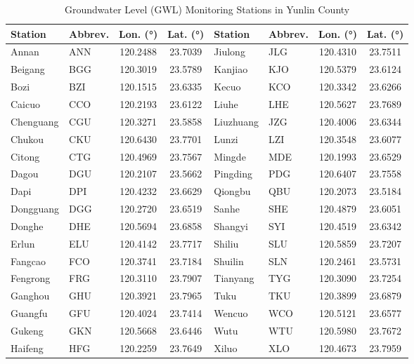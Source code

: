 \begin{table}[htbp]
	\centering
	\footnotesize
	\setlength{\tabcolsep}{2.5pt}
	\caption{Groundwater Level (GWL) Monitoring Stations in Yunlin County}
	\label{tab:gwl_info}
	\begin{tabular}{llcc|llcc}
		\toprule
		\textbf{Station} & \textbf{Abbrev.} & \textbf{Lon. (\si{\degree})} & \textbf{Lat. (\si{\degree})} & \textbf{Station} & \textbf{Abbrev.} & \textbf{Lon. (\si{\degree})} & \textbf{Lat. (\si{\degree})} \\
		\midrule
		Annan & ANN & 120.2488 & 23.7039 & Jiulong & JLG & 120.4310 & 23.7511 \\
		Beigang & BGG & 120.3019 & 23.5789 & Kanjiao & KJO & 120.5379 & 23.6124 \\
		Bozi & BZI & 120.1515 & 23.6335 & Kecuo & KCO & 120.3342 & 23.6266 \\
		Caicuo & CCO & 120.2193 & 23.6122 & Liuhe & LHE & 120.5627 & 23.7689 \\
		Chenguang & CGU & 120.3271 & 23.5858 & Liuzhuang & JZG & 120.4006 & 23.6344 \\
		Chukou & CKU & 120.6430 & 23.7701 & Lunzi & LZI & 120.3548 & 23.6077 \\
		Citong & CTG & 120.4969 & 23.7567 & Mingde & MDE & 120.1993 & 23.6529 \\
		Dagou & DGU & 120.2107 & 23.5662 & Pingding & PDG & 120.6407 & 23.7558 \\
		Dapi & DPI & 120.4232 & 23.6629 & Qiongbu & QBU & 120.2073 & 23.5184 \\
		Dongguang & DGG & 120.2720 & 23.6519 & Sanhe & SHE & 120.4879 & 23.6051 \\
		Donghe & DHE & 120.5694 & 23.6858 & Shangyi & SYI & 120.4519 & 23.6342 \\
		Erlun & ELU & 120.4142 & 23.7717 & Shiliu & SLU & 120.5859 & 23.7207 \\
		Fangcao & FCO & 120.3741 & 23.7184 & Shuilin & SLN & 120.2461 & 23.5731 \\
		Fengrong & FRG & 120.3110 & 23.7907 & Tianyang & TYG & 120.3090 & 23.7254 \\
		Ganghou & GHU & 120.3921 & 23.7965 & Tuku & TKU & 120.3899 & 23.6879 \\
		Guangfu & GFU & 120.4024 & 23.7414 & Wencuo & WCO & 120.5121 & 23.6577 \\
		Gukeng & GKN & 120.5668 & 23.6446 & Wutu & WTU & 120.5980 & 23.7672 \\
		Haifeng & HFG & 120.2259 & 23.7649 & Xiluo & XLO & 120.4673 & 23.7959 \\

\end{tabular}
\end{table}
